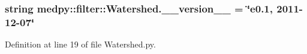 \hypertarget{namespacemedpy_1_1filter_1_1Watershed_a34650e61f770709e5dbb025c95359cd9}{
\subsubsection[{\_\-\_\-version\_\-\_\-}]{\setlength{\rightskip}{0pt plus 5cm}string {\bf medpy::filter::Watershed.\_\-\_\-version\_\-\_\-} = \char`\"{}e0.1, 2011-\/12-\/07\char`\"{}}}
\label{namespacemedpy_1_1filter_1_1Watershed_a34650e61f770709e5dbb025c95359cd9}


Definition at line 19 of file Watershed.py.

